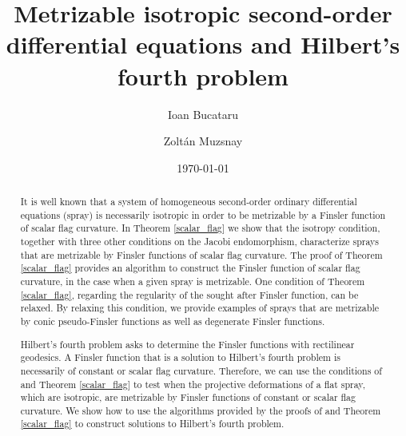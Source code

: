 \documentclass[oneside,english]{amsart}
\numberwithin{equation}{section}
\numberwithin{figure}{section}
\theoremstyle{plain}
\theoremstyle{plain}
\theoremstyle{definition}
\theoremstyle{plain}
\theoremstyle{plain}
\theoremstyle{plain}
\theoremstyle{remark}
\theoremstyle{remark}
\begin{document}
\title[Metrizable isotropic SODE and Hilbert's fourth problem]
{Metrizable isotropic second-order differential equations and Hilbert's fourth problem} 


\author[Bucataru]{Ioan Bucataru} \address{Ioan Bucataru, Faculty of
  Mathematics, Alexandru Ioan Cuza University \\ Ia\c si, 
  Romania} 

\author[Muzsnay]{Zolt\'an Muzsnay} \address{Zolt\'an Muzsnay, Institute
  of Mathematics, University of Debrecen \\Debrecen, 
  Hungary} 


\date{\today}

\begin{abstract}
It is well known that a system of homogeneous second-order ordinary
differential equations (spray) is necessarily isotropic in order to be
metrizable by a Finsler function of scalar flag curvature. In Theorem \ref{scalar_flag} we show that the
isotropy condition, together with three other conditions on the Jacobi
endomorphism, characterize sprays that are metrizable by Finsler
functions of scalar flag curvature. The proof of Theorem
\ref{scalar_flag} provides an algorithm to construct the 
Finsler function of scalar flag curvature, in the case when a given
spray is metrizable.  One condition of Theorem \ref{scalar_flag}, regarding the
regularity of the sought after Finsler function, can be relaxed.  By
relaxing this condition, we provide examples of sprays that are
metrizable by conic pseudo-Finsler functions as well as degenerate
Finsler functions.

Hilbert's fourth problem asks to determine the Finsler functions with
rectilinear geodesics. A Finsler function that is a solution to Hilbert's
fourth problem is necessarily of constant or scalar flag curvature. Therefore,
we can use the conditions of \cite[Theorem 4.1]{BM13} and Theorem
\ref{scalar_flag} to test when the projective deformations of a flat spray,
which are isotropic, are metrizable by Finsler functions of constant or scalar
flag curvature. We show how to use the algorithms provided by the proofs of
\cite[Theorem 4.1]{BM13} and Theorem \ref{scalar_flag} to construct solutions
to Hilbert's fourth problem.
\end{abstract}



\end{document}
